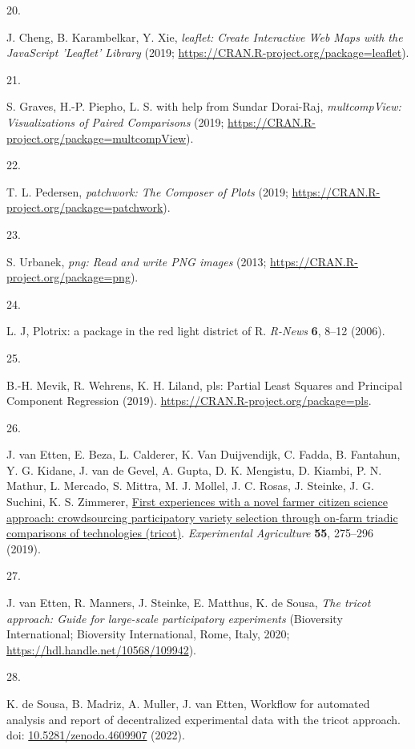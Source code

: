 \documentclass[
]{article}
\newlength{\cslhangindent}
\newlength{\csllabelwidth}
\newenvironment{CSLReferences}[2] %
 {\begin{list}{}{%
  \setlength{\itemindent}{0pt}
  \setlength{\leftmargin}{0pt}
  \setlength{\parsep}{0pt}
  \ifodd #1
   \setlength{\leftmargin}{\cslhangindent}
   \setlength{\itemindent}{-1\cslhangindent}
  \fi
  \setlength{\itemsep}{#2\baselineskip}}}
 {\end{list}}
\newcommand{\CSLLeftMargin}[1]{\parbox[t]{\csllabelwidth}{\strut#1\strut}}
\newcommand{\CSLRightInline}[1]{\parbox[t]{\linewidth - \csllabelwidth}{\strut#1\strut}}
\begin{document}
\begin{CSLReferences}{0}{1}
\CSLLeftMargin{20. }%
\CSLRightInline{J. Cheng, B. Karambelkar, Y. Xie, \emph{{leaflet: Create
Interactive Web Maps with the JavaScript 'Leaflet' Library}} (2019;
\url{https://CRAN.R-project.org/package=leaflet}).}

\CSLLeftMargin{21. }%
\CSLRightInline{S. Graves, H.-P. Piepho, L. S. with help from Sundar
Dorai-Raj, \emph{{{multcompView}: Visualizations of Paired Comparisons}}
(2019; \url{https://CRAN.R-project.org/package=multcompView}).}

\CSLLeftMargin{22. }%
\CSLRightInline{T. L. Pedersen, \emph{{{patchwork}: The Composer of
Plots}} (2019; \url{https://CRAN.R-project.org/package=patchwork}).}

\CSLLeftMargin{23. }%
\CSLRightInline{S. Urbanek, \emph{{png: Read and write PNG images}}
(2013; \url{https://CRAN.R-project.org/package=png}).}

\CSLLeftMargin{24. }%
\CSLRightInline{L. J, {Plotrix: a package in the red light district of
R}. \emph{R-News} \textbf{6}, 8--12 (2006).}

\CSLLeftMargin{25. }%
\CSLRightInline{B.-H. Mevik, R. Wehrens, K. H. Liland, {{pls}: Partial
Least Squares and Principal Component Regression} (2019).
\url{https://CRAN.R-project.org/package=pls}.}

\CSLLeftMargin{26. }%
\CSLRightInline{J. van Etten, E. Beza, L. Calderer, K. Van Duijvendijk,
C. Fadda, B. Fantahun, Y. G. Kidane, J. van de Gevel, A. Gupta, D. K.
Mengistu, D. Kiambi, P. N. Mathur, L. Mercado, S. Mittra, M. J. Mollel,
J. C. Rosas, J. Steinke, J. G. Suchini, K. S. Zimmerer,
\href{https://doi.org/10.1017/S0014479716000739}{{First experiences with
a novel farmer citizen science approach: crowdsourcing participatory
variety selection through on-farm triadic comparisons of technologies
(tricot)}}. \emph{Experimental Agriculture} \textbf{55}, 275--296
(2019).}

\CSLLeftMargin{27. }%
\CSLRightInline{J. van Etten, R. Manners, J. Steinke, E. Matthus, K. de
Sousa, \emph{{The tricot approach: Guide for large-scale participatory
experiments}} (Bioversity International; Bioversity International, Rome,
Italy, 2020; \url{https://hdl.handle.net/10568/109942}).}

\CSLLeftMargin{28. }%
\CSLRightInline{K. de Sousa, B. Madriz, A. Muller, J. van Etten,
{Workflow for automated analysis and report of decentralized
experimental data with the tricot approach}. doi:
\href{https://doi.org/10.5281/zenodo.4609907}{10.5281/zenodo.4609907}
(2022).}

\end{CSLReferences}
\end{document}
